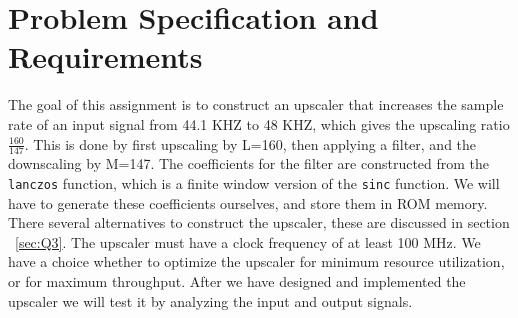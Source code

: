\section{Problem Specification and Requirements}
The goal of this assignment is to construct an upscaler that increases the sample rate of an input signal from 44.1 KHZ to 48 KHZ, which gives the upscaling ratio $\frac{160}{147}$.  This is done by first upscaling by L=160, then applying a filter, and the downscaling by M=147.  The coefficients for the filter are constructed from the \texttt{lanczos} function, which is a finite window version of the \texttt{sinc} function. We will have to generate these coefficients ourselves, and store them in ROM memory. There several alternatives to construct the upscaler, these are discussed in section ~\ref{sec:Q3}. The upscaler must have a clock frequency of at least 100 MHz. We have a choice whether to optimize the upscaler for minimum resource utilization, or for maximum throughput. After we have designed and implemented the upscaler we will test it by analyzing the input and output signals.